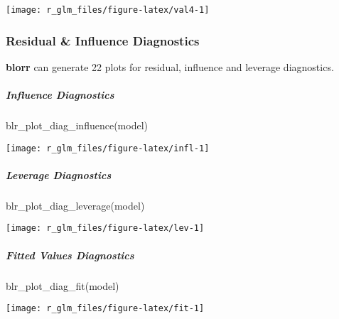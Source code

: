 \documentclass[
]{article}
\newenvironment{Shaded}{\begin{snugshade}}{\end{snugshade}}
\newcommand{\FunctionTok}[1]{\textcolor[rgb]{0.00,0.00,0.00}{#1}}
\newcommand{\NormalTok}[1]{#1}
\begin{document}
\begin{center}\texttt{[image: r\_glm\_files/figure-latex/val4-1]} \end{center}

\hypertarget{residual-influence-diagnostics}{%
\subsubsection{Residual \& Influence
Diagnostics}\label{residual-influence-diagnostics}}

\textbf{blorr} can generate 22 plots for residual, influence and
leverage diagnostics.

\hypertarget{influence-diagnostics}{%
\subparagraph{Influence Diagnostics}\label{influence-diagnostics}}

\begin{Shaded}
\begin{Highlighting}[]
\FunctionTok{blr\_plot\_diag\_influence}\NormalTok{(model)}
\end{Highlighting}
\end{Shaded}

\begin{center}\texttt{[image: r\_glm\_files/figure-latex/infl-1]} \end{center}

\hypertarget{leverage-diagnostics}{%
\subparagraph{Leverage Diagnostics}\label{leverage-diagnostics}}

\begin{Shaded}
\begin{Highlighting}[]
\FunctionTok{blr\_plot\_diag\_leverage}\NormalTok{(model)}
\end{Highlighting}
\end{Shaded}

\begin{center}\texttt{[image: r\_glm\_files/figure-latex/lev-1]} \end{center}

\hypertarget{fitted-values-diagnostics}{%
\subparagraph{Fitted Values
Diagnostics}\label{fitted-values-diagnostics}}

\begin{Shaded}
\begin{Highlighting}[]
\FunctionTok{blr\_plot\_diag\_fit}\NormalTok{(model)}
\end{Highlighting}
\end{Shaded}

\begin{center}\texttt{[image: r\_glm\_files/figure-latex/fit-1]} \end{center}
\end{document}
